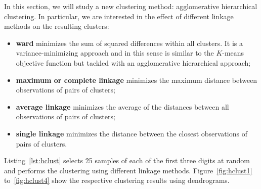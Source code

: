 \documentclass[12pt]{article}
\begin{document}
  In this section, we will study a new clustering method: agglomerative
  hierarchical clustering. In particular, we are interested in the effect of
  different linkage methods on the resulting clusters:
  \begin{itemize}
    \item \textbf{ward} minimizes the sum of squared differences within all
      clusters. It is a variance-minimizing approach and in this sense is
      similar to the $K$-means objective function but tackled with an
      agglomerative hierarchical approach;
    \item \textbf{maximum or complete linkage} minimizes the maximum distance
      between observations of pairs of clusters;
    \item \textbf{average linkage} minimizes the average of the distances
      between all observations of pairs of clusters;
    \item \textbf{single linkage} minimizes the distance between the closest
      observations of pairs of clusters.
  \end{itemize}

  Listing~\ref{lst:hclust} selects 25 samples of each of the first three digits
  at random and performs the clustering using different linkage methods.
  Figure~\ref{fig:hclust1} to~\ref{fig:hclust4} show the respective clustering
  results using dendrograms.
\end{document}
